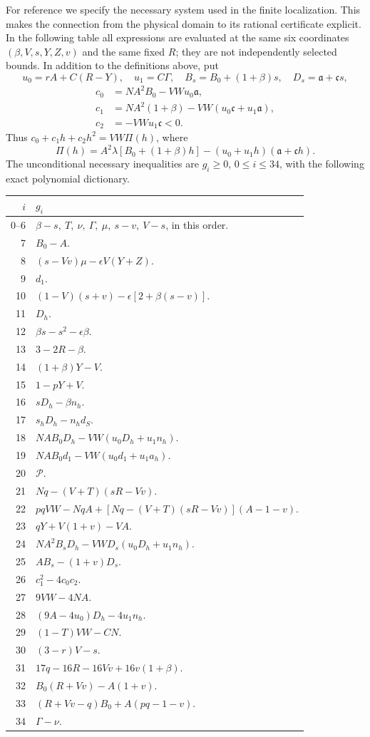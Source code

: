 \documentclass[11pt,reqno]{amsart}
\theoremstyle{definition}
\theoremstyle{remark}
\begin{document}
For reference we specify the necessary system used in the finite
localization. This makes the connection from the physical domain to
its rational certificate explicit. In the following table all
expressions are evaluated at the same six coordinates
\((\beta,V,s,Y,Z,v)\) and the same fixed \(R\); they are not
independently selected bounds. In addition to the definitions above,
put
\[
 u_0=rA+C(R-Y),\quad u_1=C\Gamma,
 \quad B_s=B_0+(1+\beta)s,\quad D_s=\mathfrak a+\mathfrak c s,
\]
\[
\begin{split}
 c_0&=NA^2B_0-VW u_0\mathfrak a,\\
 c_1&=NA^2(1+\beta)-VW(u_0\mathfrak c+u_1\mathfrak a),\\
 c_2&=-VWu_1\mathfrak c<0.
\end{split}
\]
Thus \(c_0+c_1h+c_2h^2=VW\Pi(h)\), where
\[
 \Pi(h)=A^2\lambda[B_0+(1+\beta)h]
          -(u_0+u_1h)(\mathfrak a+\mathfrak c h).
\]
The unconditional necessary inequalities are \(g_i\ge0\),
\(0\le i\le34\), with the following exact polynomial dictionary.
\begin{longtable}{@{}r p{}@{}}
\toprule
\(i\)&\(g_i\)\\
\midrule
\endhead
0--6&\(\beta-s,\ T,\ \nu,\ \Gamma,\ \mu,\ s-v,\ V-s\), in this order.\\
7&\(B_0-A\).\\
8&\((s-Vv)\mu-\epsilon V(Y+Z)\).\\
9&\(d_1\).\\
10&\((1-V)(s+v)-\epsilon[2+\beta(s-v)]\).\\
11&\(D_h\).\\
12&\(\beta s-s^2-\epsilon\beta\).\\
13&\(3-2R-\beta\).\\
14&\((1+\beta)Y-V\).\\
15&\(1-pY+V\).\\
16&\(sD_h-\beta n_h\).\\
17&\(s_hD_h-n_hd_S\).\\
18&\(NAB_0D_h-VW(u_0D_h+u_1n_h)\).\\
19&\(NAB_0d_1-VW(u_0d_1+u_1a_h)\).\\
20&\(\mathcal P\).\\
21&\(Nq-(V+T)(sR-Vv)\).\\
22&\(pqVW-NqA+[Nq-(V+T)(sR-Vv)](A-1-v)\).\\
23&\(qY+V(1+v)-VA\).\\
24&\(NA^2B_sD_h-VWD_s(u_0D_h+u_1n_h)\).\\
25&\(AB_s-(1+v)D_s\).\\
26&\(c_1^2-4c_0c_2\).\\
27&\(9VW-4NA\).\\
28&\((9A-4u_0)D_h-4u_1n_h\).\\
29&\((1-T)VW-CN\).\\
30&\((3-r)V-s\).\\
31&\(17q-16R-16Vv+16v(1+\beta)\).\\
32&\(B_0(R+Vv)-A(1+v)\).\\
33&\((R+Vv-q)B_0+A(pq-1-v)\).\\
34&\(\Gamma-\nu\).\\
\bottomrule
\end{longtable}
\end{document}
